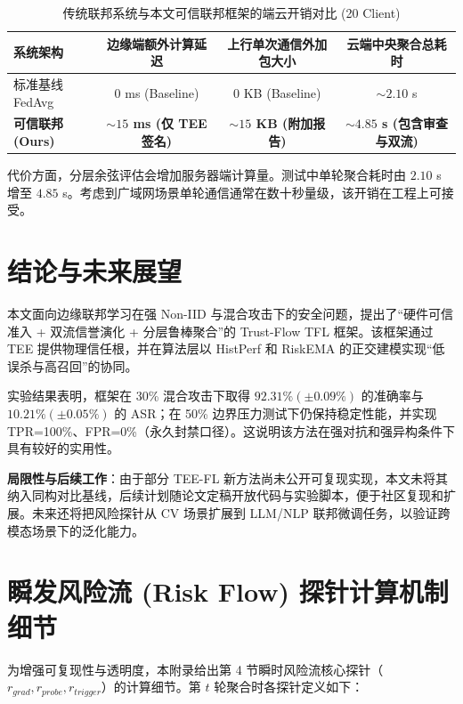 \documentclass[11pt, a4paper, UTF8, fontset=fandol]{ctexart}
\begin{document}
\begin{table}[htbp]
    \centering
    \caption{传统联邦系统与本文可信联邦框架的端云开销对比 (20 Client)}
    \vspace{4pt}
    \label{tab:overhead}
    \begin{tabular}{l c c c}
        \toprule
        \textbf{系统架构}        & \textbf{边缘端额外计算延迟}         & \textbf{上行单次通信外加包大小}  & \textbf{云端中央聚合总耗时}             \\
        \midrule
        标准基线 FedAvg          & 0 ms (Baseline)                     & 0 KB (Baseline)                  & $\sim 2.10$ s                           \\
        \textbf{可信联邦 (Ours)} & \textbf{$\sim 15$ ms (仅 TEE 签名)} & \textbf{$\sim 15$ KB (附加报告)} & \textbf{$\sim 4.85$ s (包含审查与双流)} \\
        \bottomrule
    \end{tabular}
\end{table}

代价方面，分层余弦评估会增加服务器端计算量。测试中单轮聚合耗时由 $2.10$ s 增至 $4.85$ s。考虑到广域网场景单轮通信通常在数十秒量级，该开销在工程上可接受。

\section{结论与未来展望}
本文面向边缘联邦学习在强 Non-IID 与混合攻击下的安全问题，提出了“硬件可信准入 + 双流信誉演化 + 分层鲁棒聚合”的 Trust-Flow TFL 框架。该框架通过 TEE 提供物理信任根，并在算法层以 HistPerf 和 RiskEMA 的正交建模实现“低误杀与高召回”的协同。

实验结果表明，框架在 30\% 混合攻击下取得 $92.31\% (\pm 0.09\%)$ 的准确率与 $10.21\% (\pm 0.05\%)$ 的 ASR；在 50\% 边界压力测试下仍保持稳定性能，并实现 TPR=100\%、FPR=0\%（永久封禁口径）。这说明该方法在强对抗和强异构条件下具有较好的实用性。

\textbf{局限性与后续工作}：由于部分 TEE-FL 新方法尚未公开可复现实现，本文未将其纳入同构对比基线，后续计划随论文定稿开放代码与实验脚本，便于社区复现和扩展。未来还将把风险探针从 CV 场景扩展到 LLM/NLP 联邦微调任务，以验证跨模态场景下的泛化能力。

\appendix
\section{瞬发风险流 (Risk Flow) 探针计算机制细节}
为增强可复现性与透明度，本附录给出第 4 节瞬时风险流核心探针（$r_{grad}, r_{probe}, r_{trigger}$）的计算细节。第 $t$ 轮聚合时各探针定义如下：
\end{document}
